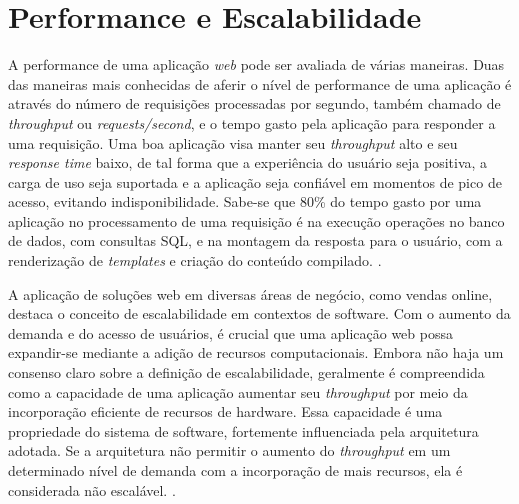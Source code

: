 \section{Performance e Escalabilidade}

A performance de uma aplicação \textit{web} pode ser avaliada de várias maneiras. Duas das maneiras mais conhecidas de aferir o nível de performance de uma aplicação é através do número de requisições processadas por segundo, também chamado de \textit{throughput} ou \textit{requests/second}, e o tempo gasto pela aplicação para responder a uma requisição. Uma boa aplicação visa manter seu \textit{throughput} alto e seu \textit{response time} baixo, de tal forma que a experiência do usuário seja positiva, a carga de uso seja suportada e a aplicação seja confiável em momentos de pico de acesso, evitando indisponibilidade. Sabe-se que 80\% do tempo gasto por uma aplicação no processamento de uma requisição é na execução operações no banco de dados, com consultas SQL, e na montagem da resposta para o usuário, com a renderização de \textit{templates} e criação do conteúdo compilado. \cite{jugo2014analysis}.

A aplicação de soluções web em diversas áreas de negócio, como vendas online, destaca o conceito de escalabilidade em contextos de software. Com o aumento da demanda e do acesso de usuários, é crucial que uma aplicação web possa expandir-se mediante a adição de recursos computacionais. Embora não haja um consenso claro sobre a definição de escalabilidade, geralmente é compreendida como a capacidade de uma aplicação aumentar seu \textit{throughput} por meio da incorporação eficiente de recursos de hardware. Essa capacidade é uma propriedade do sistema de software, fortemente influenciada pela arquitetura adotada. Se a arquitetura não permitir o aumento do \textit{throughput} em um determinado nível de demanda com a incorporação de mais recursos, ela é considerada não escalável. \cite{williams2004web}. 